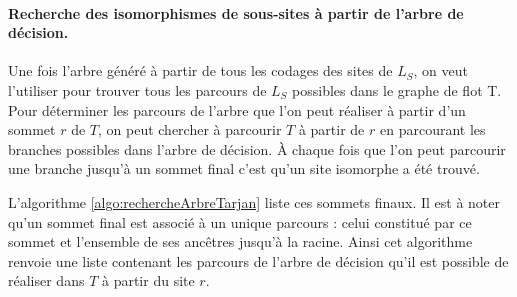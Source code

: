 \paragraph{Recherche des isomorphismes de sous-sites à partir de l'arbre de décision.}
Une fois l'arbre généré à partir de tous les codages des sites de $L_S$, on veut l'utiliser pour trouver tous les parcours de $L_S$ possibles dans le graphe de flot T. 
Pour déterminer les parcours de l'arbre que l'on peut réaliser à partir d'un sommet $r$ de $T$, on peut chercher à parcourir $T$ à partir de $r$ en parcourant les branches possibles dans l'arbre de décision. À chaque fois que l'on peut parcourir une branche jusqu'à un sommet final c'est qu'un site isomorphe a été trouvé. 

L'algorithme \ref{algo:rechercheArbreTarjan} liste ces sommets finaux. Il est à noter qu'un sommet final est associé à un unique parcours : celui constitué par ce sommet et l'ensemble de ses ancêtres jusqu'à la racine. Ainsi cet algorithme renvoie une liste contenant les parcours de l'arbre de décision qu'il est possible de réaliser dans $T$ à partir du site $r$.

